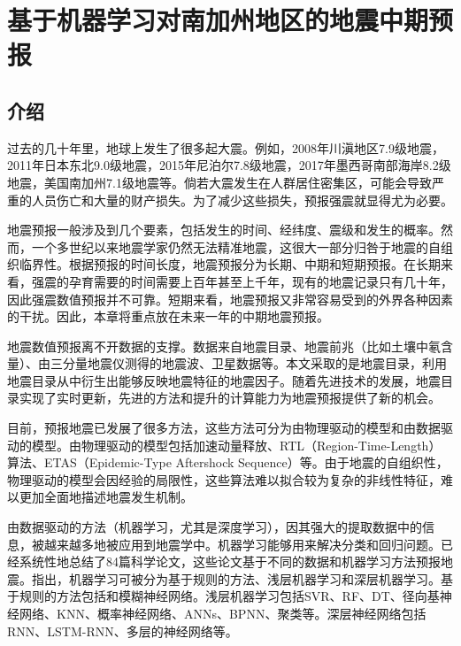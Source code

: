\chapter{基于机器学习对南加州地区的地震中期预报}\label{chap:ml_seismic}

\section{介绍}\label{sec:seism_introduction}

过去的几十年里，地球上发生了很多起大震。例如，2008年川滇地区7.9级地震，2011年日本东北9.0级地震，2015年尼泊尔7.8级地震，2017年墨西哥南部海岸8.2级地震，美国南加州7.1级地震等。倘若大震发生在人群居住密集区，可能会导致严重的人员伤亡和大量的财产损失。为了减少这些损失，预报强震就显得尤为必要。

地震预报一般涉及到几个要素，包括发生的时间、经纬度、震级和发生的概率\citep{Allen1976Responsibilities}。然而，一个多世纪以来地震学家仍然无法精准地震，这很大一部分归咎于地震的自组织临界性\citep{Geller2007Earthquake}。根据预报的时间长度，地震预报分为长期、中期和短期预报\citep{Zhang2002An,Pulinets2018What}。在长期来看，强震的孕育需要的时间需要上百年甚至上千年，现有的地震记录只有几十年，因此强震数值预报并不可靠。短期来看，地震预报又非常容易受到的外界各种因素的干扰。因此，本章将重点放在未来一年的中期地震预报。

地震数值预报离不开数据的支撑。数据来自地震目录、地震前兆（比如土壤中氡含量）、由三分量地震仪测得的地震波、卫星数据等\citep{al2020application}。本文采取的是地震目录，利用地震目录从中衍生出能够反映地震特征的地震因子。随着先进技术的发展，地震目录实现了实时更新，先进的方法和提升的计算能力为地震预报提供了新的机会。

目前，预报地震已发展了很多方法，这些方法可分为由物理驱动的模型和由数据驱动的模型。由物理驱动的模型包括加速动量释放\citep{Ben2002Accelerated}、RTL（Region-Time-Length）算法\citep{Sobolev2007On}、ETAS（Epidemic-Type Aftershock Sequence）\citep{Ogata1986Statistical}等。由于地震的自组织性，物理驱动的模型会因经验的局限性，这些算法难以拟合较为复杂的非线性特征，难以更加全面地描述地震发生机制。

由数据驱动的方法（机器学习，尤其是深度学习），因其强大的提取数据中的信息，被越来越多地被应用到地震学中\citep{Alves2006Earthquake,Madahizadeh2009prediction,Panakkat2007Neural,Sunkara2009Model}。机器学习能够用来解决分类和回归问题。\citet{al2020application}已经系统性地总结了84篇科学论文，这些论文基于不同的数据和机器学习方法预报地震。\citet{al2020application}指出，机器学习可被分为基于规则的方法、浅层机器学习和深层机器学习。基于规则的方法包括\citep{zhong2010prediction,zamani2013application,mirrashid2014earthquake}和模糊神经网络\citep{Lopez2019Evolutionary}。浅层机器学习包括SVR\citep{asencio2017temporal}、RF\citep{asim2017earthquake}、DT\citep{asencio2017temporal}、径向基神经网络\citep{Alexandridis2014Large}、KNN\citep{Panakkat2007Neural,asencio2017temporal}、概率神经网络\citep{Adeli2009A}、ANNs\citep{morales2013earthquake,asencio2017temporal}、BPNN\citep{Panakkat2007Neural,Narayanakumar2016A}、聚类\citep{shodiq2018neural}等。深层神经网络包括RNN\citep{Panakkat2009Recurrent,asim2017earthquake}、LSTM-RNN\citep{Wang2017Earthquake,Bhatia2018EARTHQUAKE,berhich2020lstm}、多层的神经网络\citep{huang2018large}等。

